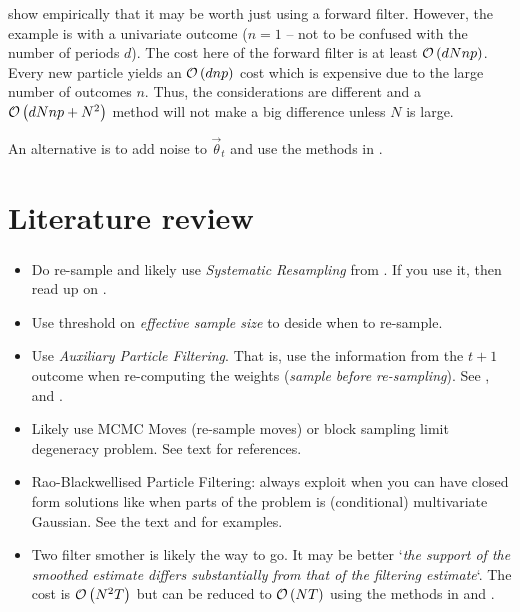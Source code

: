 \citet{kantas15} show empirically that it may be worth just using a forward filter. However, the example is with a univariate outcome ($n=1$ -- not to be confused with the number of periods $d$). The cost here of the forward filter is at least $\mathcal{O}\left( dNnp\right)$. Every new particle yields an $\mathcal{O}\left( dnp\right)$ cost which is expensive due to the large number of outcomes $n$. Thus, the considerations are different and a $\mathcal{O}\left( dNnp + N^2\right)$ method will not make a big difference unless $N$ is large.

An alternative is to add noise to $\vec{\theta}_{t}$ and use the methods in \cite{andrieu02}.





\iffalse
\section{Literature review}
\subsubsection*{\cite{doucet09}}
\begin{itemize}
	\item Do re-sample and likely use \emph{Systematic Resampling} from \cite{kitagawa96}. If you use it, then read up on \cite{douc05}.
	\item Use threshold on \emph{effective sample size} to deside when to re-sample.
	\item Use \emph{Auxiliary Particle Filtering}. That is, use the information from the $t + 1$ outcome when re-computing the weights (\textit{sample before re-sampling}). See \cite{carpenter99}, \cite{pitt01} and \cite{pitt99}.
	\item Likely use MCMC Moves (re-sample moves) or block sampling limit degeneracy problem. See text for references.
	\item Rao-Blackwellised Particle Filtering: always exploit when you can have closed form solutions like when parts of the problem is (conditional) multivariate Gaussian. See the text and \cite{andrieu02} for examples. 
	\item Two filter smother is likely the way to go. It may be better `\textit{the support of the smoothed estimate differs substantially from that of the filtering estimate}`. The cost is $\mathcal{O}\left( N^2T\right)$ but can be reduced to $\mathcal{O}\left( NT\right)$ using the methods in \cite{fearnhead10} and \cite{briers05}.
\end{itemize}

